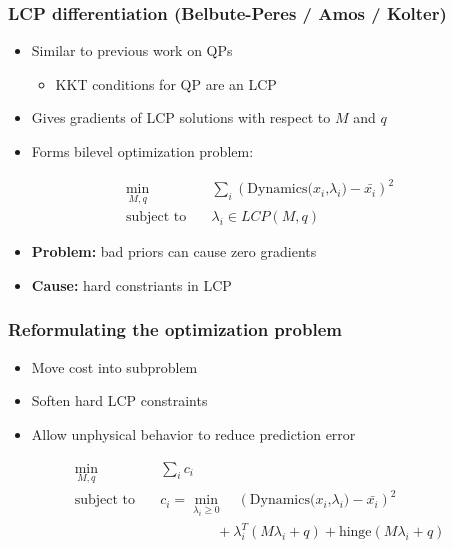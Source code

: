 \documentclass{beamer}
\begin{document}
\begin{frame}
    \frametitle{LCP differentiation (Belbute-Peres / Amos / Kolter)}
    \begin{itemize}
        \item Similar to previous work on QPs
            \begin{itemize}
                \item KKT conditions for QP are an LCP
            \end{itemize}
        \item Gives gradients of LCP solutions with respect to $M$ and $q$
        \item Forms bilevel optimization problem:
    \end{itemize}
    \begin{align*}
        \min_{M,q} \quad &\sum_i (\textrm{Dynamics($x_i$,$\lambda_i$)} - \bar{x_i})^2 \\
        \textrm{subject to} \quad &\lambda_i \in LCP(M, q)
    \end{align*}
    \begin{itemize}
        \item \textbf{Problem:} bad priors can cause zero gradients
        \item \textbf{Cause:} hard constriants in LCP
    \end{itemize}
\end{frame}

\begin{frame}
    \frametitle{Reformulating the optimization problem}
    \begin{itemize}
        \item Move cost into subproblem
        \item Soften hard LCP constraints
        \item Allow unphysical behavior to reduce prediction error
    \end{itemize}
    \begin{align*}
        \min_{M,q} \quad &\sum_i c_i \\
        \textrm{subject to} \quad &c_i = \min_{\lambda_i \geq 0} \quad (\textrm{Dynamics($x_i$,$\lambda_i$)} - \bar{x_i})^2\\
                                  & \quad \quad \quad \quad + \lambda_i^T (M \lambda_i + q)
                                                                    + \textrm{hinge}(M\lambda_i + q)
    \end{align*}
\end{frame}
\end{document}
